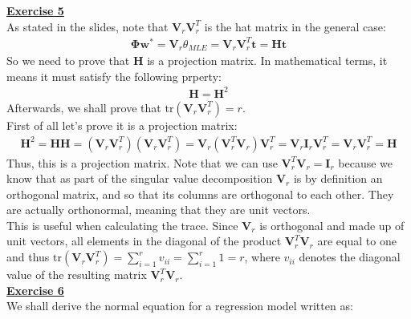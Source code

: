 \documentclass[a4paper, 11pt]{article}
\begin{document}
\newpage
\textbf{\underline{Exercise 5}}\\
\newline As stated in the slides, note that $\mathbf{V}_{r} \mathbf{V}_{r}^{T}$ is the hat matrix in the general case:\\
\begin{eqnarray}
\mathbf{\Phi} \mathbf{w}^{*} = \mathbf{V}_{r} \theta_{MLE} = \mathbf{V}_{r} \mathbf{V}_{r}^{T}  \mathbf{t} = \mathbf{H} \mathbf{t} \nonumber
\end{eqnarray}
So we need to prove that $\mathbf{H}$ is a projection matrix. In mathematical terms, it means it must satisfy the following prperty:
\begin{eqnarray}
\mathbf{H} = \mathbf{H}^2 \nonumber
\end{eqnarray}
Afterwards, we shall prove that $\text{tr}\left( \mathbf{V}_r \mathbf{V}_{r}^{T} \right) = r$.\\
\newline First of all let's prove it is a projection matrix:
\begin{eqnarray}
\mathbf{H}^2 = \mathbf{H} \mathbf{H} = \left( \mathbf{V}_r \mathbf{V}_{r}^{T} \right) \left( \mathbf{V}_r \mathbf{V}_{r}^{T} \right) = \mathbf{V}_r \left( \mathbf{V}_{r}^{T} \mathbf{V}_r \right) \mathbf{V}_{r}^{T}  =  \mathbf{V}_r \mathbf{I}_r \mathbf{V}_{r}^{T} = \mathbf{V}_r \mathbf{V}_{r}^{T} = \mathbf{H} \nonumber
\end{eqnarray}
Thus, this is a projection matrix. Note that we can use $\mathbf{V}_{r}^{T} \mathbf{V}_r = \mathbf{I}_r$ because we know that as part of the singular value decomposition $\mathbf{V}_r$ is by definition an orthogonal matrix, and so that its columns are orthogonal to each other. They are actually orthonormal, meaning that they are unit vectors.\\
\newline This is useful when calculating the trace. Since $\mathbf{V}_r$ is orthogonal and made up of unit vectors, all elements in the diagonal of the product $\mathbf{V}_{r}^{T} \mathbf{V}_r$ are equal to one and thus $\text{tr}\left( \mathbf{V}_r \mathbf{V}_{r}^{T} \right) = \sum_{i=1}^r v_{ii} =  \sum_{i=1}^r 1 = r$, where $v_{ii}$ denotes the diagonal value of the resulting matrix $\mathbf{V}_{r}^{T} \mathbf{V}_r$.\\
\newpage
\textbf{\underline{Exercise 6}}\\
\newline We shall derive the normal equation for a regression model written as:
\end{document}
